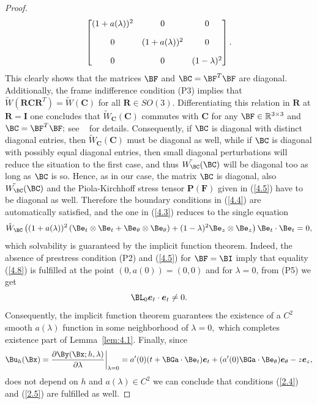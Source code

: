 \begin{proof}
\begin{equation}
\begin{bmatrix}
(1+a(\lambda))^2 & 0 &0 \\[10pt]
 0 & (1+a(\lambda))^2  & 0 \\[10pt]
 0 & 0 & (1-\lambda)^2
\end{bmatrix}.
\end{equation}
This clearly shows that the matrices $\BF$ and $\BC=\BF^T \BF$ are diagonal. Additionally, the frame indifference condition (P3) implies that $\tilde{W}\left(\bm R \bm C \bm R^T\right)=\tilde W(\bm C)$ for all $\bm R \in S O(3)$. Differentiating this relation in $\bm R$ at $\boldsymbol{R}=\boldsymbol{I}$ one concludes that 
$\tilde{W}_{\boldsymbol{C}}(\boldsymbol{C})$ commutes with $\boldsymbol{C}$ for any $\BF\in\mathbb R^{3\times 3}$ and $\BC=\BF^T \BF;$ see ~\cite[page 290]{bib:Gur.Fri.Ana.} for details. Consequently, if $\BC$ is diagonal with distinct diagonal entries, then $\tilde{W}_{\boldsymbol{C}}(\boldsymbol{C})$ must be diagonal as well, while if $\BC$ is diagonal with possibly equal diagonal entries, then small diagonal perturbations will reduce the situation to the first case, and thus  
$\tilde{W_\BC}(\BC)$ will be diagonal too as long as $\BC$ is so. Hence, as in our case, the matrix $\BC$ is diagonal, also $\tilde{W_\BC}(\BC)$ and the Piola-Kirchhoff stress tensor $\bm P(\bm F)$ given in (\ref{4.5}) have to be diagonal as well. 
Therefore the boundary conditions in (\ref{4.4}) are automatically satisfied, and the one in (\ref{4.3}) reduces to the single equation
\begin{equation}
\label{4.8}
\hat{W}_{\BC}\left((1+a(\lambda))^{2}\left(\Be_{t} \otimes \Be_{t}+\Be_{\theta} \otimes \Be_{\theta}\right)+(1-\lambda)^{2} \Be_{z} \otimes \Be_{z}\right)
 \Be_{t} \cdot \Be_{t}=0, 
\end{equation}
which solvability is guaranteed by the implicit function theorem. Indeed, the absence of prestress condition (P2) and (\ref{4.5}) for $\BF=\BI$ imply that equality (\ref{4.8}) is fulfilled at the point $(0,a(0))=(0,0)$ and for $\lambda=0$, from (P5) we get 
$$\BL_0\bm e_t\cdot \bm e_t\neq 0.$$
Consequently, the implicit function theorem guarantees the existence of a $C^2$ smooth $a(\lambda)$ function in some neighborhood of 
$\lambda=0,$ which completes existence part of Lemma~\ref{lem:4.1}. Finally, since
$$\Bu_h(\Bx)=\frac{\partial \By(\Bx;h,\lambda)}{\partial \lambda}\bigg\vert_{\lambda=0}=
a'(0)(t+\BGa\cdot\Be_t)\bm e_t+(a'(0)\BGa\cdot\Be_\Gth) \bm e_\Gth-z\bm e_z,$$
does not depend on $h$ and  $a(\lambda) \in C^2$ we can conclude that conditions (\ref{2.4}) and (\ref{2.5})
are fulfilled as well. 

\end{proof}

